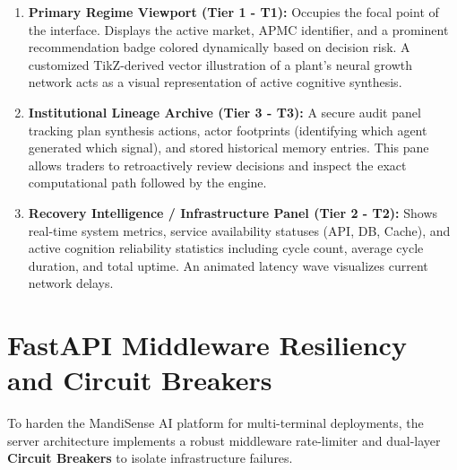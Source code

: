 \documentclass[12pt,a4paper]{report}
\begin{document}
\begin{enumerate}
    \item \textbf{Primary Regime Viewport (Tier 1 - T1):} 
    Occupies the focal point of the interface. Displays the active market, APMC identifier, and a prominent recommendation badge colored dynamically based on decision risk. A customized TikZ-derived vector illustration of a plant's neural growth network acts as a visual representation of active cognitive synthesis.
    
    \item \textbf{Institutional Lineage Archive (Tier 3 - T3):} 
    A secure audit panel tracking plan synthesis actions, actor footprints (identifying which agent generated which signal), and stored historical memory entries. This pane allows traders to retroactively review decisions and inspect the exact computational path followed by the engine.
    
    \item \textbf{Recovery Intelligence / Infrastructure Panel (Tier 2 - T2):} 
    Shows real-time system metrics, service availability statuses (API, DB, Cache), and active cognition reliability statistics including cycle count, average cycle duration, and total uptime. An animated latency wave visualizes current network delays.
\end{enumerate}

\section{FastAPI Middleware Resiliency and Circuit Breakers}

To harden the MandiSense AI platform for multi-terminal deployments, the server architecture implements a robust middleware rate-limiter and dual-layer \textbf{Circuit Breakers} to isolate infrastructure failures.
\end{document}

